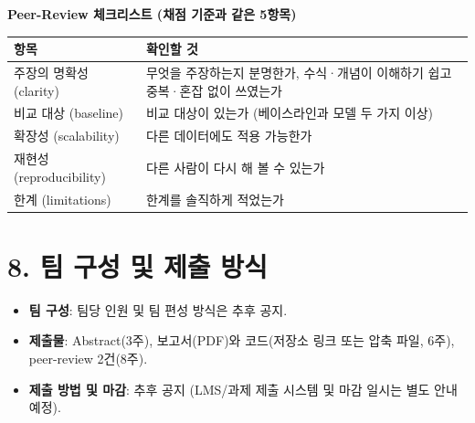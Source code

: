 \documentclass[12pt]{article}
\begin{document}
\vspace{4pt}
\noindent\textbf{Peer-Review 체크리스트 (채점 기준과 같은 5항목)}
\begin{center}
\small
\begin{tabular}{@{}ll@{}}
\toprule
항목 & 확인할 것 \\
\midrule
주장의 명확성 (clarity) & 무엇을 주장하는지 분명한가, 수식·개념이 이해하기 쉽고 중복·혼잡 없이 쓰였는가 \\
비교 대상 (baseline) & 비교 대상이 있는가 (베이스라인과 모델 두 가지 이상) \\
확장성 (scalability) & 다른 데이터에도 적용 가능한가 \\
재현성 (reproducibility) & 다른 사람이 다시 해 볼 수 있는가 \\
한계 (limitations) & 한계를 솔직하게 적었는가 \\
\bottomrule
\end{tabular}
\end{center}

\section*{8. 팀 구성 및 제출 방식}
\begin{itemize}
\item \textbf{팀 구성}: 팀당 인원 및 팀 편성 방식은 추후 공지.
\item \textbf{제출물}: Abstract(3주), 보고서(PDF)와 코드(저장소 링크 또는 압축
  파일, 6주), peer-review 2건(8주).
\item \textbf{제출 방법 및 마감}: 추후 공지 (LMS/과제 제출 시스템
  및 마감 일시는 별도 안내 예정).
\end{itemize}
\end{document}
